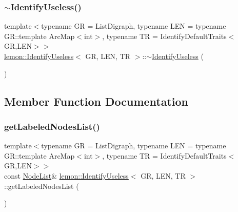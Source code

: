\mbox{\label{classlemon_1_1_identify_useless_ae172f96d5b16abb8cb808e1dcb883d6c}} 
\subsubsection{\texorpdfstring{$\sim$\+Identify\+Useless()}{~IdentifyUseless()}}
{\footnotesize\ttfamily template$<$typename GR  = List\+Digraph, typename L\+EN  = typename G\+R\+::template Arc\+Map$<$int$>$, typename TR  = Identify\+Default\+Traits$<$\+G\+R,\+L\+E\+N$>$$>$ \\
\hyperlink{classlemon_1_1_identify_useless}{lemon\+::\+Identify\+Useless}$<$ GR, L\+EN, TR $>$\+::$\sim$\hyperlink{classlemon_1_1_identify_useless}{Identify\+Useless} (\begin{DoxyParamCaption}{ }\end{DoxyParamCaption})\hspace{0.3cm}{\ttfamily [inline]}}



\subsection{Member Function Documentation}
\mbox{\label{classlemon_1_1_identify_useless_a2e8edf47e8d037ec5c2c6e5aa9fac5a2}} 
\subsubsection{\texorpdfstring{get\+Labeled\+Nodes\+List()}{getLabeledNodesList()}}
{\footnotesize\ttfamily template$<$typename GR  = List\+Digraph, typename L\+EN  = typename G\+R\+::template Arc\+Map$<$int$>$, typename TR  = Identify\+Default\+Traits$<$\+G\+R,\+L\+E\+N$>$$>$ \\
const \hyperlink{classlemon_1_1_identify_useless_a9de719ca7cb13d499ff99c728d4ec16e}{Node\+List}\& \hyperlink{classlemon_1_1_identify_useless}{lemon\+::\+Identify\+Useless}$<$ GR, L\+EN, TR $>$\+::get\+Labeled\+Nodes\+List (\begin{DoxyParamCaption}{ }\end{DoxyParamCaption})\hspace{0.3cm}{\ttfamily [inline]}}

